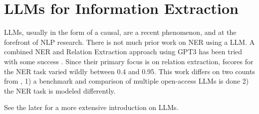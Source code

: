 \section{LLMs for Information Extraction}\label{sec:llmie}
\glspl{LLM}, usually in the form of a \gls{causal}, are a recent phenomenon, and at the forefront of \gls{NLP} research.
There is not much prior work on \gls{NER} using a \gls{LLM}.
A combined \gls{NER} and Relation Extraction approach using \gls{GPT3} has been tried with some success \cite{dunn_structured_2022}.
Since their primary focus is on relation extraction, \glspl{fscore} for the \gls{NER} task varied wildly between 0.4 and 0.95.
This work differs on two counts from \cite{dunn_structured_2022}, 1) a benchmark and comparison of multiple open-access \glspl{LLM} is done 2) the \gls{NER} task is modeled differently.

See the later  for a more extensive introduction on \glspl{LLM}. 

